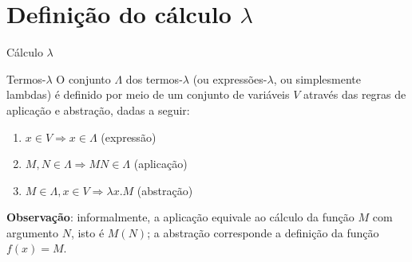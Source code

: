 \section{Definição do cálculo $\lambda$}

\begin{frame}[fragile]{Cálculo $\lambda$}

    \begin{block}{Termos-$\lambda$}
        O conjunto $\Lambda$ dos termos-$\lambda$ (ou expressões-$\lambda$, ou 
        simplesmente lambdas) é definido por
        meio de um conjunto de variáveis $V$ através das regras de aplicação e abstração,
        dadas a seguir:
        \begin{enumerate}
            \item $x\in V \Rightarrow x\in \Lambda$ (expressão)
            \item $M, N\in \Lambda \Rightarrow MN\in \Lambda$ (aplicação)
            \item $M\in \Lambda, x\in V \Rightarrow \lambda x.M$ (abstração)
        \end{enumerate}
    \end{block}

    \vspace{0.1in}

    \textbf{Observação}: informalmente, a aplicação equivale ao cálculo da função 
        $M$ com argumento $N$, isto é $M(N)$; a abstração corresponde a definição da função 
        $f(x) = M$.

\end{frame}


